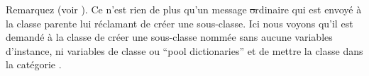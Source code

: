 \documentclass[a4paper,10pt,twoside]{book}
\begin{document}
Remarquez 
(voir ).
Ce n'est rien de plus qu'un message \st ordinaire qui est envoyé à
la classe parente lui réclamant de créer une sous-classe.
Ici nous voyons qu'il est demandé à la classe  de
créer une sous-classe nommée  sans aucune variables
d'instance, ni variables de classe ou ``pool dictionaries'' et de 
mettre la classe  dans la catégorie .




\end{document}
